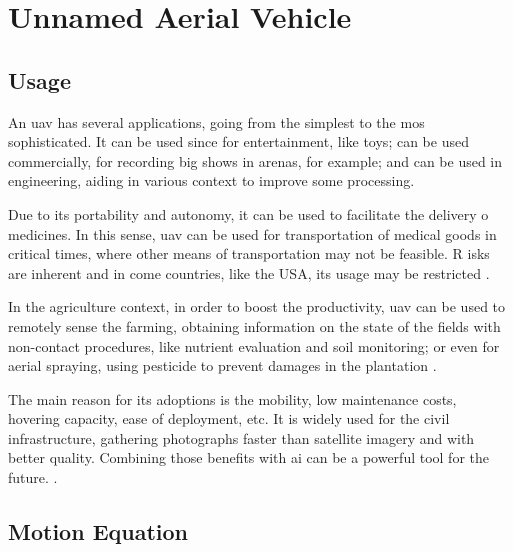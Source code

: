 \section{Unnamed Aerial Vehicle}

\subsection{Usage}

An \gls*{uav} has several applications, going from the simplest to the mos sophisticated. It can be used since for entertainment, like toys; can be used commercially, for recording big shows in arenas, for example; and can be used in engineering, aiding in various context to improve some processing.

Due to its portability and autonomy, it can be used to facilitate the delivery o medicines. In this sense, \gls*{uav} can be used for transportation of medical goods in critical times, where other means of transportation may not be feasible. R
isks are inherent and in come countries, like the USA, its usage may be restricted \citep{thiels2015}.

In the agriculture context, in order to boost the productivity, \gls*{uav} can be used to remotely sense the farming, obtaining information on the state of the fields with non-contact procedures, like nutrient evaluation and soil monitoring; or even for aerial spraying, using pesticide to prevent damages in the plantation \citep{delcerro2021}.

The main reason for its adoptions is the mobility, low maintenance costs, hovering capacity, ease of deployment, etc. 
It is widely used for the civil infrastructure, gathering photographs faster than  satellite imagery and with better quality. 
Combining those benefits with \gls*{ai} can be a powerful tool for the future. \citet{sivakumar2021}. 

\subsection{Motion Equation}

